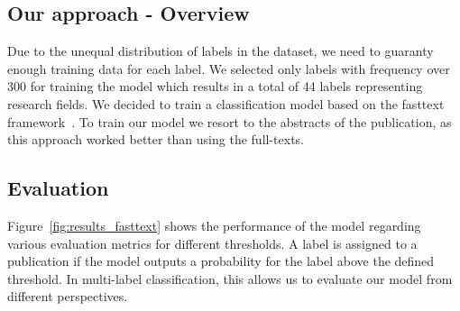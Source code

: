 \subsection{Our approach - Overview }
Due to the unequal distribution of labels in the dataset, we need to guaranty enough training data for each label.
We selected only labels with frequency over 300 for training the model which results in a total of 44 labels representing research fields.
We decided to train a classification model based on the fasttext framework~\cite{joulin2017bag}. To train our model we resort to the abstracts of the publication, as this approach worked better than using the full-texts.  



\subsection{Evaluation}
Figure~\ref{fig:results_fasttext} shows the performance of the model regarding various evaluation metrics for different thresholds. A label is assigned to a publication if the model outputs a probability for the label above the defined threshold. In multi-label classification, this allows us to evaluate our model from different perspectives.


